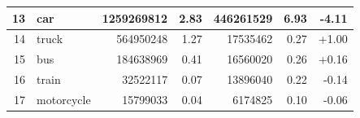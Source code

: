 \documentclass[a4paper,12pt]{report}
\begin{document}
\begin{table}[]
{\begin{tabular}{|r|l|r|r|r|r|r|}
            13                                                                                     & car           & 1259269812                          & 2.83                                                                                   & 446261529                                                                             & 6.93                                                                                        & -4.11                                                                                          \\ \hline
            14                                                                                     & truck         & 564950248                           & 1.27                                                                                   & 17535462                                                                              & 0.27                                                                                        & +1.00                                                                                          \\ \hline
            15                                                                                     & bus           & 184638969                           & 0.41                                                                                   & 16560020                                                                              & 0.26                                                                                        & +0.16                                                                                          \\ \hline
            16                                                                                     & train         & 32522117                            & 0.07                                                                                   & 13896040                                                                              & 0.22                                                                                        & -0.14                                                                                          \\ \hline
            17                                                                                     & motorcycle    & 15799033                            & 0.04                                                                                   & 6174825                                                                               & 0.10                                                                                        & -0.06                                                                                          \\ \hline

\end{tabular}}
\end{table}
\end{document}
